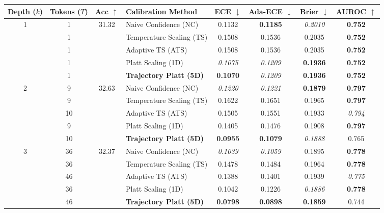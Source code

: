 \begin{table}[t]
\setlength{\tabcolsep}{4pt}
\renewcommand{\arraystretch}{1.05}
\centering
\footnotesize
\begin{tabular}{ccclcccc}
\toprule
\textbf{Depth ($k$)} & \textbf{Tokens ($T$)} & \textbf{Acc} $\uparrow$ & \textbf{Calibration Method} & \textbf{ECE} $\downarrow$ & \textbf{Ada-ECE} $\downarrow$ & \textbf{Brier} $\downarrow$ & \textbf{AUROC} $\uparrow$ \\
\midrule
\multirow{5}{*}{1} & 1 & \multirow{5}{*}{31.32} & Naive Confidence (NC) & 0.1132 & \textbf{0.1185} & \textit{0.2010} & \textbf{0.752} \\
 & 1 &  & Temperature Scaling (TS) & 0.1508 & 0.1536 & 0.2035 & \textbf{0.752} \\
 & 1 &  & Adaptive TS (ATS) & 0.1508 & 0.1536 & 0.2035 & \textbf{0.752} \\
 & 1 &  & Platt Scaling (1D) & \textit{0.1075} & \textit{0.1209} & \textbf{0.1936} & \textbf{0.752} \\
 & 1 &  & \textbf{Trajectory Platt (5D)} & \textbf{0.1070} & \textit{0.1209} & \textbf{0.1936} & \textbf{0.752} \\
\midrule
\multirow{5}{*}{2} & 9 & \multirow{5}{*}{32.63} & Naive Confidence (NC) & \textit{0.1220} & \textit{0.1221} & \textbf{0.1879} & \textbf{0.797} \\
 & 9 &  & Temperature Scaling (TS) & 0.1622 & 0.1651 & 0.1965 & \textbf{0.797} \\
 & 10 &  & Adaptive TS (ATS) & 0.1505 & 0.1551 & 0.1933 & \textit{0.794} \\
 & 9 &  & Platt Scaling (1D) & 0.1405 & 0.1476 & 0.1908 & \textbf{0.797} \\
 & 10 &  & \textbf{Trajectory Platt (5D)} & \textbf{0.0955} & \textbf{0.1079} & \textit{0.1888} & 0.765 \\
\midrule
\multirow{5}{*}{3} & 36 & \multirow{5}{*}{32.37} & Naive Confidence (NC) & \textit{0.1039} & \textit{0.1059} & 0.1895 & \textbf{0.778} \\
 & 36 &  & Temperature Scaling (TS) & 0.1478 & 0.1484 & 0.1964 & \textbf{0.778} \\
 & 46 &  & Adaptive TS (ATS) & 0.1388 & 0.1401 & 0.1939 & \textit{0.775} \\
 & 36 &  & Platt Scaling (1D) & 0.1042 & 0.1226 & \textit{0.1886} & \textbf{0.778} \\
 & 46 &  & \textbf{Trajectory Platt (5D)} & \textbf{0.0798} & \textbf{0.0898} & \textbf{0.1859} & 0.744 \\
\midrule

\end{tabular}
\end{table}
